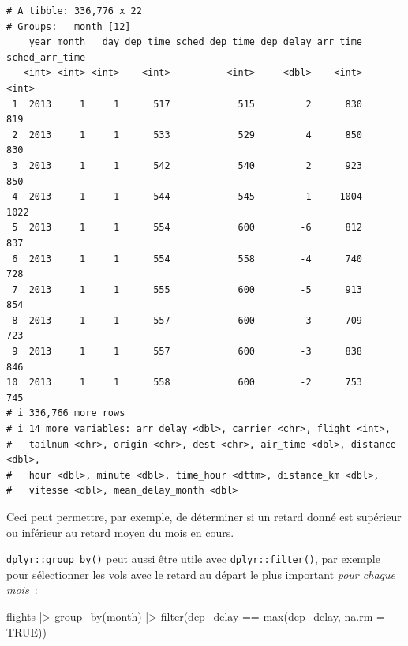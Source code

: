 \documentclass[
  letterpaper,
  DIV=11,
  numbers=noendperiod,
  oneside]{scrreprt}
\newenvironment{Shaded}{\begin{snugshade}}{\end{snugshade}}
\newcommand{\AttributeTok}[1]{\textcolor[rgb]{0.40,0.45,0.13}{#1}}
\newcommand{\ConstantTok}[1]{\textcolor[rgb]{0.56,0.35,0.01}{#1}}
\newcommand{\FunctionTok}[1]{\textcolor[rgb]{0.28,0.35,0.67}{#1}}
\newcommand{\NormalTok}[1]{\textcolor[rgb]{0.00,0.23,0.31}{#1}}
\newcommand{\SpecialCharTok}[1]{\textcolor[rgb]{0.37,0.37,0.37}{#1}}
\begin{document}
\begin{verbatim}
# A tibble: 336,776 x 22
# Groups:   month [12]
    year month   day dep_time sched_dep_time dep_delay arr_time sched_arr_time
   <int> <int> <int>    <int>          <int>     <dbl>    <int>          <int>
 1  2013     1     1      517            515         2      830            819
 2  2013     1     1      533            529         4      850            830
 3  2013     1     1      542            540         2      923            850
 4  2013     1     1      544            545        -1     1004           1022
 5  2013     1     1      554            600        -6      812            837
 6  2013     1     1      554            558        -4      740            728
 7  2013     1     1      555            600        -5      913            854
 8  2013     1     1      557            600        -3      709            723
 9  2013     1     1      557            600        -3      838            846
10  2013     1     1      558            600        -2      753            745
# i 336,766 more rows
# i 14 more variables: arr_delay <dbl>, carrier <chr>, flight <int>,
#   tailnum <chr>, origin <chr>, dest <chr>, air_time <dbl>, distance <dbl>,
#   hour <dbl>, minute <dbl>, time_hour <dttm>, distance_km <dbl>,
#   vitesse <dbl>, mean_delay_month <dbl>
\end{verbatim}

Ceci peut permettre, par exemple, de déterminer si un retard donné est
supérieur ou inférieur au retard moyen du mois en cours.

\texttt{dplyr::group\_by()} peut aussi être utile avec
\texttt{dplyr::filter()}, par exemple pour sélectionner les vols avec le
retard au départ le plus important \emph{pour chaque mois}~:

\begin{Shaded}
\begin{Highlighting}[]
\NormalTok{flights }\SpecialCharTok{|\textgreater{}} 
  \FunctionTok{group\_by}\NormalTok{(month) }\SpecialCharTok{|\textgreater{}} 
  \FunctionTok{filter}\NormalTok{(dep\_delay }\SpecialCharTok{==} \FunctionTok{max}\NormalTok{(dep\_delay, }\AttributeTok{na.rm =} \ConstantTok{TRUE}\NormalTok{))}
\end{Highlighting}
\end{Shaded}
\end{document}
